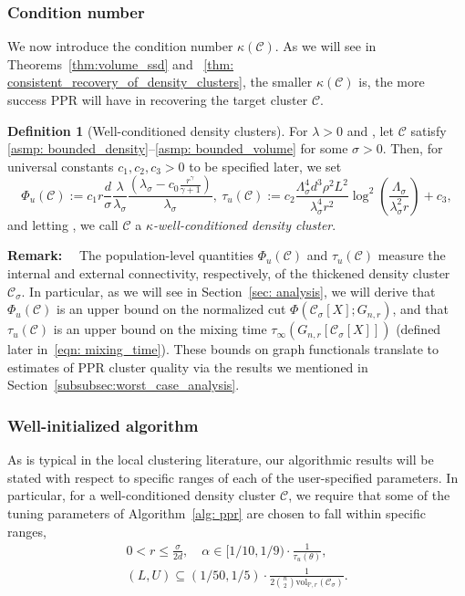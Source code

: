 \documentclass{article}
\newcommand{\vol}{\mathrm{vol}}
\newcommand{\1}{\mathbf{1}}
\newcommand{\Cset}{\mathcal{C}}
\newcommand{\Csig}{\Cset_{\sigma}}
\newcommand{\Pbb}{\mathbb{P}}
\newcommand{\Cbb}{\mathbb{C}}
\theoremstyle{alden}
\theoremstyle{aldenthm}
\theoremstyle{definition}
\newtheorem{definition}{Definition}[section]
\theoremstyle{remark}
\begin{document}
\subsubsection{Condition number} 
We now introduce the condition number $\kappa(\Cset)$. As we will see in Theorems~\ref{thm:volume_ssd} and ~\ref{thm: consistent_recovery_of_density_clusters},
the smaller $\kappa(\Cset)$ is, the
more success PPR will have in recovering the target cluster $\Cset$.

\begin{definition}[Well-conditioned density clusters]
	\label{def:well_conditioned_density_cluster}
	For $\lambda > 0$ and \smash{$\Cset \in \Cbb_f(\lambda)$}, let $\Cset$ satisfy 
	\ref{asmp: bounded_density}--\ref{asmp: bounded_volume} for some $\sigma > 0$. Then, for universal constants $c_1, c_2, c_3 > 0$ to be specified
	later, we set 
	\begin{equation}
	\label{eqn: condition_number_1}
	\Phi_u(\Cset) 
	:= c_1 r \frac{d}{\sigma} \frac{\lambda}{\lambda_{\sigma}}
	\frac{(\lambda_{\sigma} - c_0 \frac{r^{\gamma}}{\gamma +
			1})}{\lambda_{\sigma}},~  
	\tau_u(\Cset) := c_2 \frac{\Lambda_{\sigma}^4 d^3 \rho^2
		L^2}{\lambda_{\sigma}^4 r^2} \log^2\left(\frac{\Lambda_{\sigma}}{\lambda_{\sigma}^2r}\right) + c_3,
	\end{equation}
	and letting \smash{$\kappa(\Cset) := \Phi_{u}(\Cset) \cdot
		\tau_{u}(\Cset)$}, we call $\Cset$ a 
	\emph{$\kappa$-well-conditioned density cluster}.  
\end{definition}

\textbf{Remark:}~~ The population-level quantities $\Phi_u(\Cset)$ and  $\tau_{u}(\Cset)$ measure the internal and external connectivity, respectively, of the thickened density cluster $\Csig$. In particular, as we will see in Section~\ref{sec: analysis}, we will derive that $\Phi_u(\Cset)$ is an upper bound on the normalized cut $\Phi(\Csig[X];G_{n,r})$, and that $\tau_{u}(\Cset)$ is an upper bound on the mixing time $\tau_{\infty}(G_{n,r}[\Csig[X]])$ (defined later in~\eqref{eqn: mixing_time}). These bounds on graph functionals translate to estimates of PPR cluster quality via the results we mentioned in Section~\ref{subsubsec:worst_case_analysis}.

\subsubsection{Well-initialized algorithm} As is typical in the local clustering
literature, our algorithmic results will be stated with respect to specific
ranges of each of the user-specified parameters. In particular, for a
well-conditioned density cluster $\Cset$, we require that some of the tuning parameters of Algorithm~\ref{alg: ppr} are chosen to fall within specific ranges,
\begin{equation}
\begin{gathered}
\label{eqn: initialization}
0 < r \leq \frac{\sigma}{2d}, \quad 
\alpha \in [1/10, 1/9) \cdot \frac{1}{\tau_u(\theta)}, \\
(L,U) \subseteq (1/50,1/5) \cdot \frac{1}{2{n \choose 2}\vol_{\Pbb,r}(\Csig)}.
\end{gathered}
\end{equation}
\end{document}
